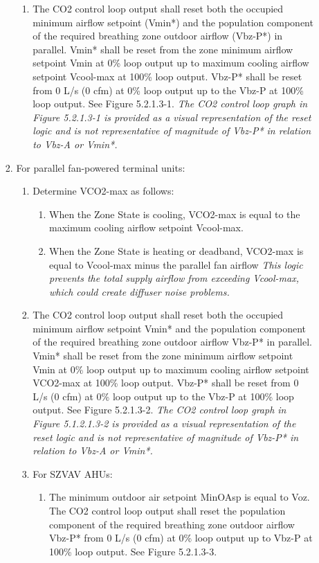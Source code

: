 \documentclass[10pt]{article}
\begin{document}
\begin{enumerate}
\begin{enumerate}
\begin{enumerate}
\begin{enumerate}
          \item The CO2 control loop output shall reset both the occupied minimum airflow setpoint (Vmin*) and the population component of the required breathing zone outdoor airflow (Vbz-P*) in parallel. Vmin* shall be reset from the zone minimum airflow setpoint Vmin at 0\% loop output up to maximum cooling airflow setpoint Vcool-max at 100\% loop output. Vbz-P* shall be reset from 0 L/s (0 cfm) at 0\% loop output up to the Vbz-P at 100\% loop output. See Figure 5.2.1.3-1.
          \textit{The CO2 control loop graph in Figure 5.2.1.3-1 is provided as a visual representation of the reset logic and is not representative of magnitude of Vbz-P* in relation to Vbz-A or Vmin*.}
        \end{enumerate}
        \item For parallel fan-powered terminal units:
        \begin{enumerate}
          \item Determine VCO2-max as follows:
          \begin{enumerate}
           \item When the Zone State is cooling, VCO2-max is equal to the maximum cooling airflow setpoint Vcool-max.
           \item When the Zone State is heating or deadband, VCO2-max is equal to Vcool-max minus the parallel fan airflow
           \textit{This logic prevents the total supply airflow from exceeding Vcool-max, which could create diffuser noise problems.}
          \end{enumerate}
          \item The CO2 control loop output shall reset both the occupied minimum airflow setpoint Vmin* and the population component of the required breathing zone outdoor airflow Vbz-P* in parallel. Vmin* shall be reset from the zone minimum airflow setpoint Vmin at 0\% loop output up to maximum cooling airflow setpoint VCO2-max at 100\% loop output. Vbz-P* shall be reset from 0 L/s (0 cfm) at 0\% loop output up to the Vbz-P at 100\% loop output. See Figure 5.2.1.3-2.
          \textit{The CO2 control loop graph in Figure 5.1.2.1.3-2 is provided as a visual representation of the reset logic and is not representative of magnitude of Vbz-P* in relation to Vbz-A or Vmin*.}
          \item For SZVAV AHUs:
          \begin{enumerate}
            \item The minimum outdoor air setpoint MinOAsp is equal to Voz. The CO2 control loop output shall reset the population component of the required breathing zone outdoor airflow Vbz-P* from 0 L/s (0 cfm) at 0\% loop output up to Vbz-P at 100\% loop output. See Figure 5.2.1.3-3.    
          \end{enumerate}
        \end{enumerate}
      \end{enumerate}
    \end{enumerate}
  \end{enumerate}
\fi
\ifdefined\CaliforniaTitle
\end{document}
